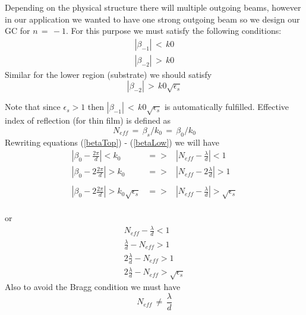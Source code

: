 \documentclass{article}
\begin{document}
Depending on the physical structure there will multiple outgoing beams, however in our application we wanted to have one strong outgoing beam so we design our GC for $n \, = \, -1$. For this purpose we must satisfy the following conditions:
\begin{eqnarray}
\nonumber |\beta_{-1}| \, < \, k0 \\
|\beta_{-2}| \, > \, k0
\label{betaTop}
\end{eqnarray}
Similar for the lower region (substrate) we should satisfy
\begin{equation}
|\beta_{-2}| \, > \, k0\sqrt{\epsilon_s}
\label{betaLow}
\end{equation}

Note that since $\epsilon_s > 1$ then  $|\beta_{-1}| \, < \, k0\sqrt{\epsilon_s}$ is automatically fulfilled.
Effective index of reflection (for thin film) is defined as 
\begin{equation}
N_{eff} \, = \, \beta_s/k_0 \, = \, \beta_0/k_0
\end{equation}
Rewriting equations (\ref{betaTop}) - (\ref{betaLow}) we will have
\begin{eqnarray*}
|\beta_0 -\frac{2\pi}{d}| <k_0 & => & |N_{eff}-\frac{\lambda}{d}| < 1\\
|\beta_0 -2\frac{2\pi}{d}| >k_0 & => & |N_{eff}-2\frac{\lambda}{d}| > 1\\ \\
|\beta_0 -2\frac{2\pi}{d}| >k_0 \sqrt{\epsilon_s} & => & |N_{eff}-\frac{\lambda}{d}| > \sqrt{\epsilon_s} \\
\end{eqnarray*}

or
\begin{eqnarray}
N_{eff}-\frac{\lambda}{d} < 1 \\
\frac{\lambda}{d} -N_{eff} > 1 \\
2\frac{\lambda}{d} - N_{eff} >1 \\
2\frac{\lambda}{d} - N_{eff} > \sqrt{\epsilon_s}
\end{eqnarray}
Also to avoid the Bragg condition we must have 
\begin{equation}
N_{eff} \, \neq \, \frac{\lambda}{d} 
\end{equation}
\end{document}
